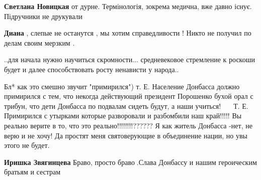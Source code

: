 \begin{itemize}
\begin{itemize}
 
\textbf{Светлана Новицкая} от дурне. Термінологія, зокрема медична, вже давно існує. Підручники не друкували

\end{itemize}

 
\textbf{Диана} , слепые не останутся , мы хотим справедливости ! Никто не получил по делам своим мерзким .

 
..для начала нужно научиться скромности... средневековое стремление к роскоши
будет и далее способствовать росту ненависти у народа..


Бл* как это смешно звучит "примирился") т. Е. Население Донбасса должно
примирился с тем, что некогда действующий президент Порошенко бухой орал с
трибун, что дети Донбасса по подвалам сидеть будут, а наши учиться! 🤬🤬🤬🤬 Т.
Е. Примирился с утырками которые разворовали и разбомбили наш край!!!!! Вы
реально верите в то, что это реально!!!!!!!!?????? Я как житель Донбасса -нет,
не верю и не хочу! Да простят меня святоверующие в объединение нации, но увы
этого не будет.

\begin{itemize}
 
\textbf{Иришка Звягинцева} Браво, просто браво👏.Слава Донбассу и нашим героическим братьям и сестрам


\end{itemize}
\end{itemize}
